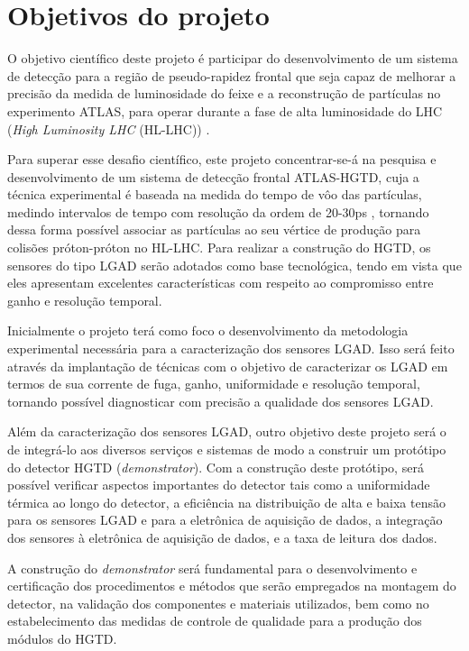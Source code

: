 
\chapter{Objetivos do projeto}

O objetivo científico deste projeto é participar do desenvolvimento de um sistema de detecção para a região de pseudo-rapidez frontal que seja capaz de melhorar a precisão da medida de luminosidade do feixe e a reconstrução de partículas no experimento ATLAS, para operar durante a fase de alta luminosidade do LHC ({\it High Luminosity LHC} (HL-LHC)) \cite{HL_LHC,tdr}. 

Para superar esse desafio científico, este projeto concentrar-se-á na pesquisa e desenvolvimento de um sistema de detecção frontal ATLAS-HGTD, cuja a técnica experimental é baseada na medida do tempo de vôo das partículas, medindo intervalos de tempo com resolução da ordem de 20-30ps \cite{tdr}, tornando dessa forma possível associar as partículas ao seu vértice de produção para colisões próton-próton no HL-LHC. Para realizar a construção do HGTD, os sensores do tipo LGAD serão adotados como base tecnológica, tendo em vista que eles apresentam excelentes características com respeito ao compromisso entre ganho e resolução temporal. 
\thispagestyle{plain}

Inicialmente o projeto terá como foco o desenvolvimento da metodologia experimental necessária para a caracterização dos sensores LGAD. Isso será feito através da implantação de técnicas com o objetivo de caracterizar os LGAD em termos de sua corrente de fuga, ganho, uniformidade e resolução temporal, tornando possível diagnosticar com precisão a qualidade dos sensores LGAD.

Além da caracterização dos sensores LGAD, outro objetivo deste projeto será o de integrá-lo aos diversos serviços e sistemas de modo a construir um protótipo do detector HGTD (\textit{demonstrator}). Com a construção deste protótipo, será possível verificar aspectos importantes do detector tais como a uniformidade térmica ao longo do detector, a eficiência na distribuição de alta e baixa tensão para os sensores LGAD e para a eletrônica de aquisição de dados, a integração dos sensores à eletrônica de aquisição de dados, e a taxa de leitura dos dados.

A construção do \textit{demonstrator} será fundamental para o desenvolvimento e certificação dos procedimentos e métodos que serão empregados na montagem do detector, na validação dos componentes e materiais utilizados, bem como no estabelecimento das medidas de controle de qualidade para a produção dos módulos do HGTD.


